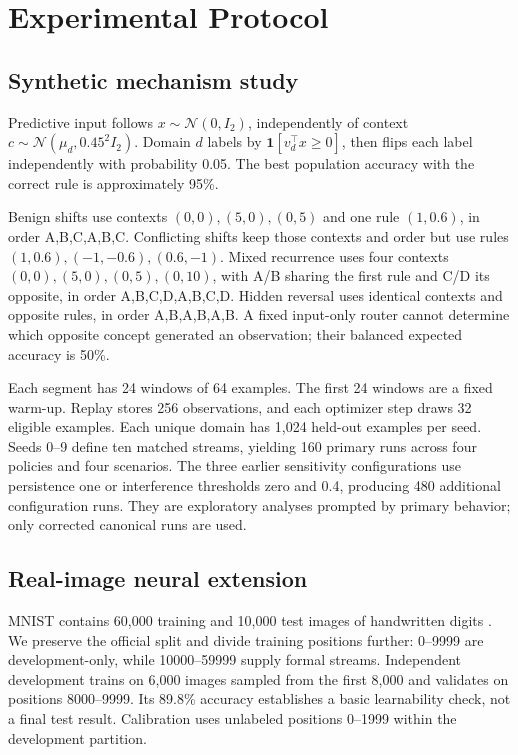 \section{Experimental Protocol}
\subsection{Synthetic mechanism study}
Predictive input follows \(x\sim\mathcal N(0,I_2)\), independently of context \(c\sim\mathcal N(\mu_d,0.45^2I_2)\). Domain \(d\) labels by \(\mathbf{1}[v_d^\top x\geq0]\), then flips each label independently with probability 0.05. The best population accuracy with the correct rule is approximately 95\%.

Benign shifts use contexts \((0,0),(5,0),(0,5)\) and one rule \((1,0.6)\), in order A,B,C,A,B,C. Conflicting shifts keep those contexts and order but use rules \((1,0.6),(-1,-0.6),(0.6,-1)\). Mixed recurrence uses four contexts \((0,0),(5,0),(0,5),(0,10)\), with A/B sharing the first rule and C/D its opposite, in order A,B,C,D,A,B,C,D. Hidden reversal uses identical contexts and opposite rules, in order A,B,A,B,A,B. A fixed input-only router cannot determine which opposite concept generated an observation; their balanced expected accuracy is 50\%.

Each segment has 24 windows of 64 examples. The first 24 windows are a fixed warm-up. Replay stores 256 observations, and each optimizer step draws 32 eligible examples. Each unique domain has 1,024 held-out examples per seed. Seeds 0--9 define ten matched streams, yielding 160 primary runs across four policies and four scenarios. The three earlier sensitivity configurations use persistence one or interference thresholds zero and 0.4, producing 480 additional configuration runs. They are exploratory analyses prompted by primary behavior; only corrected canonical runs are used.

\subsection{Real-image neural extension}
MNIST contains 60,000 training and 10,000 test images of handwritten digits \cite{mnist}. We preserve the official split and divide training positions further: 0--9999 are development-only, while 10000--59999 supply formal streams. Independent development trains on 6,000 images sampled from the first 8,000 and validates on positions 8000--9999. Its 89.8\% accuracy establishes a basic learnability check, not a final test result. Calibration uses unlabeled positions 0--1999 within the development partition.

